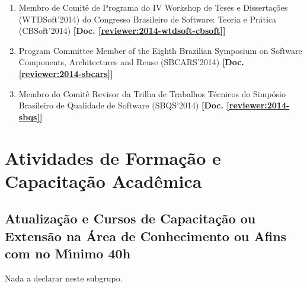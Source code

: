 \documentclass[a4paper,oneside,10pt]{article}
\newcounter{document}%
\newcommand\Doc{{\addtocounter{document}{1}\mbox{\sffamily\bfseries [Doc. \arabic{document}]}}}
\begin{document}
\begin{enumerate}
    \item Membro de Comitê de Programa do IV Workshop de Teses e Dissertações (WTDSoft'2014) do Congresso Brasileiro de Software: Teoria e Prática (CBSoft'2014) \textbf{[Doc. \ref{reviewer:2014-wtdsoft-cbsoft}]}

    \item Program Committee Member of the Eighth Brazilian Symposium on Software Components, Architectures and Reuse (SBCARS'2014) \textbf{[Doc. \ref{reviewer:2014-sbcars}]}

    \item Membro do Comitê Revisor da Trilha de Trabalhos Técnicos do Simpósio Brasileiro de Qualidade de Software (SBQS'2014) \textbf{[Doc. \ref{reviewer:2014-sbqs}]}

\end{enumerate}

\newpage
\section{Atividades de Forma\c{c}\~{a}o e Capacita\c{c}\~{a}o Acad\^{e}mica}
\vspace{0.3cm}


\subsection{Atualiza\c{c}\~{a}o e Cursos de Capacita\c{c}\~{a}o ou Extens\~{a}o na \'{A}rea de Conhecimento ou Afins com no M\'{\i}nimo 40h}
\vspace{0.3cm}

Nada a declarar neste subgrupo.


\end{document}
